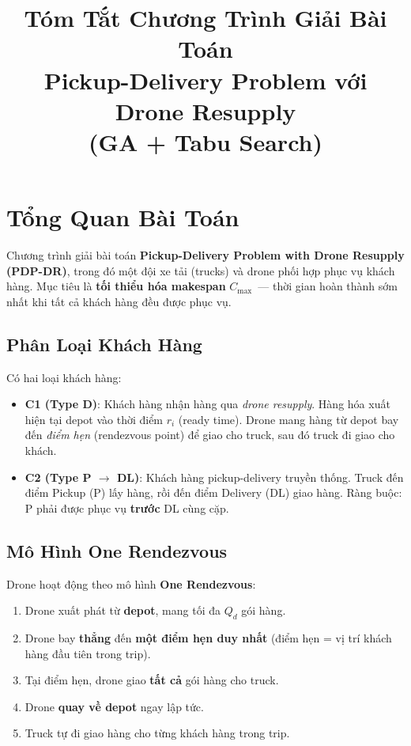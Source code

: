 \documentclass[12pt,a4paper]{article}
\title{\textbf{Tóm Tắt Chương Trình Giải Bài Toán \\ Pickup-Delivery Problem với Drone Resupply \\ (GA + Tabu Search)}}
\author{}
\date{}
\begin{document}
\maketitle

\section{Tổng Quan Bài Toán}

Chương trình giải bài toán \textbf{Pickup-Delivery Problem with Drone Resupply (PDP-DR)}, trong đó một đội xe tải (trucks) và drone phối hợp phục vụ khách hàng. Mục tiêu là \textbf{tối thiểu hóa makespan} $C_{\max}$~--- thời gian hoàn thành sớm nhất khi tất cả khách hàng đều được phục vụ.

\subsection{Phân Loại Khách Hàng}

Có hai loại khách hàng:
\begin{itemize}[nosep]
    \item \textbf{C1 (Type D)}: Khách hàng nhận hàng qua \textit{drone resupply}. Hàng hóa xuất hiện tại depot vào thời điểm $r_i$ (ready time). Drone mang hàng từ depot bay đến \textit{điểm hẹn} (rendezvous point) để giao cho truck, sau đó truck đi giao cho khách.
    \item \textbf{C2 (Type P $\to$ DL)}: Khách hàng pickup-delivery truyền thống. Truck đến điểm Pickup (P) lấy hàng, rồi đến điểm Delivery (DL) giao hàng. Ràng buộc: P phải được phục vụ \textbf{trước} DL cùng cặp.
\end{itemize}

\subsection{Mô Hình One Rendezvous}

Drone hoạt động theo mô hình \textbf{One Rendezvous}:
\begin{enumerate}[nosep]
    \item Drone xuất phát từ \textbf{depot}, mang tối đa $Q_d$ gói hàng.
    \item Drone bay \textbf{thẳng} đến \textbf{một điểm hẹn duy nhất} (điểm hẹn = vị trí khách hàng đầu tiên trong trip).
    \item Tại điểm hẹn, drone giao \textbf{tất cả} gói hàng cho truck.
    \item Drone \textbf{quay về depot} ngay lập tức.
    \item Truck tự đi giao hàng cho từng khách hàng trong trip.
\end{enumerate}
\end{document}
